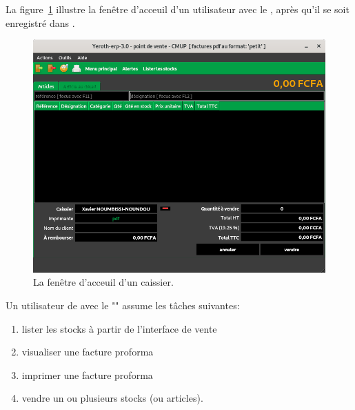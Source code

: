 \label{sec:utilisateurs-lecaissier}

La figure~\ref{fig:fenetre-principale-caissier} illustre la
fen\^etre d'acceuil d'un utilisateur avec le \role \caissier,
apr\`es qu'il se soit enregistr\'e dans \yeren.\\

\begin{figure}[!htbp]
\centering
\includegraphics[scale=0.63]{images/yeren-fenetre-caissier.png}
\caption{La fen\^etre d'acceuil d'un caissier.}
\label{fig:fenetre-principale-caissier}
\end{figure}

Un utilisateur de \yeren avec le \role "\caissier" assume
les t\^aches suivantes:
\begin{enumerate}[1)]
	\item lister les stocks \`a partir de l'interface de vente	
	\item visualiser une facture proforma		
	\item imprimer une facture proforma
	\item vendre un ou plusieurs stocks (ou articles).\\
\end{enumerate}